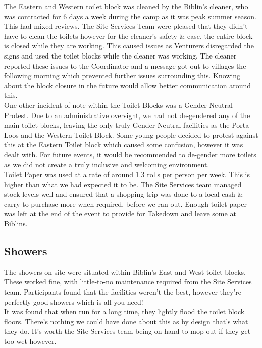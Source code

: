 The Eastern and Western toilet block was cleaned by the Biblin's cleaner, who was contracted for 6 days a week during the camp as it was peak summer season. This had mixed reviews. The Site Services Team were pleased that they didn't have to clean the toilets however for the cleaner's safety \& ease, the entire block is closed while they are working. This caused issues as Venturers disregarded the signs and used the toilet blocks while the cleaner was working. The cleaner reported these issues to the Coordinator and a message got out to villages the following morning which prevented further issues surrounding this. Knowing about the block closure in the future would allow better communication around this. \\

One other incident of note within the Toilet Blocks was a Gender Neutral Protest. Due to an administrative oversight, we had not de-gendered any of the main toilet blocks, leaving the only truly Gender Neutral facilities as the Porta-Loos and the Western Toilet Block. Some young people decided to protest against this at the Eastern Toilet block which caused some confusion, however it was dealt with. For future events, it would be recommended to de-gender more toilets as we did not create a truly inclusive and welcoming environment.\\

Toilet Paper was used at a rate of around 1.3 rolls per person per week. This is higher than what we had expected it to be. The Site Services team managed stock levels well and ensured that a shopping trip was done to a local cash \& carry to purchase more when required, before we ran out. Enough toilet paper was left at the end of the event to provide for Takedown and leave some at Biblins.
\subsection{Showers}
The showers on site were situated within Biblin's East and West toilet blocks. These worked fine, with little-to-no maintenance required from the Site Services team. Participants found that the facilities weren't the best, however they're perfectly good showers which is all you need!\\

It was found that when run for a long time, they lightly flood the toilet block floors. There's nothing we could have done about this as by design that's what they do. It's worth the Site Services team being on hand to mop out if they get too wet however.\\

